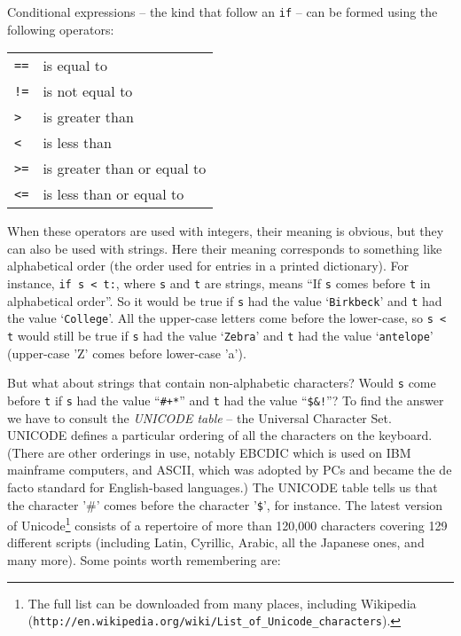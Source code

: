 Conditional expressions -- the kind that follow an \verb!if! --
can be formed using the following operators:
\medskip

\begin{tabular}{ll}
\verb+==+ &is equal to\\
\verb+!=+ &is not equal to\\
\verb+>+ &is greater than\\
\verb+<+ &is less than\\
\verb+>=+ & is greater than or equal to\\
\verb+<=+ &is less than or equal to\\
\end{tabular}
\medskip

When these operators are used with integers, their meaning is obvious,
but they can also be used with strings.  Here their meaning corresponds
to something like alphabetical order (the order used for entries in a
printed dictionary).  For instance, \verb!if s < t:!,
where  \verb!s! and \verb!t! are strings, means ``If  \verb!s! comes before \verb!t!
in alphabetical order''.  So it would be true if  \verb!s! had the value
`\verb!Birkbeck!' and \verb!t! had the value `\verb!College!'.  All the
upper-case letters come before the lower-case, so \verb!s < t! would
still be true if  \verb!s! had the value `\verb!Zebra!' and \verb!t! had the
value `\verb!antelope!' (upper-case 'Z' comes before lower-case 'a').

But what about strings that contain non-alphabetic characters?  Would
\verb!s!  come before \verb!t! if \verb!s! had the value ``\verb!#+*!''
and \verb!t! had the value ``\verb+$&!+''?  To find the answer we have
to consult the \emph{UNICODE table} -- the Universal Character Set.
UNICODE defines a particular ordering of all the characters on the
keyboard.  (There are other orderings in use, notably EBCDIC which is
used on IBM mainframe computers, and ASCII, which was adopted by PCs and
became the de facto standard for English-based languages.)
The UNICODE table tells us that the character '\#' comes before the
character '\verb!$!', for instance.  The latest version of Unicode\footnote{The full list can be downloaded from many
places, including Wikipedia
(\texttt{http://en.wikipedia.org/wiki/List\_of\_Unicode\_characters}).}
consists of a repertoire of more than 120,000 characters covering 129
different scripts (including Latin, Cyrillic, Arabic, all the Japanese
ones, and many more). Some points worth remembering are:

